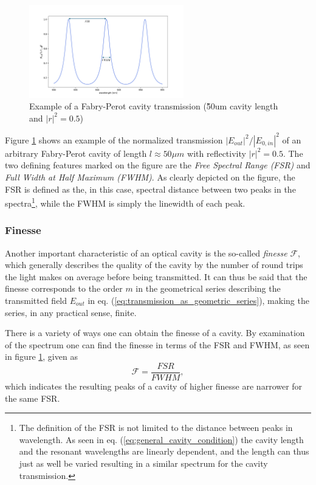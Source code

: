 \begin{figure}
    \centering
    \includegraphics[width=0.6\textwidth]{figures/fabry_perot_example.pdf}
    \caption{Example of a Fabry-Perot cavity transmission (\~50um cavity length and $|r|^2 = 0.5$)}
    \label{fig:generic_fabry_perot}
\end{figure}

Figure \ref{fig:generic_fabry_perot} shows an example of the normalized transmission $|E_{out}|^2/|E_{0,in}|^2$ of an arbitrary Fabry-Perot cavity of length $l \approx 50 \mu m$ with reflectivity $|r|^2 = 0.5$. The two defining features marked on the figure are the \emph{Free Spectral Range (FSR)} and \emph{Full Width at Half Maximum (FWHM)}. As clearly depicted on the figure, the FSR is defined as the, in this case, spectral distance between two peaks in the spectra\footnote{The definition of the FSR is not limited to the distance between peaks in wavelength. As seen in eq. (\ref{eq:general_cavity_condition}) the cavity length and the resonant wavelengths are linearly dependent, and the length can thus just as well be varied resulting in a similar spectrum for the cavity transmission.}, while the FWHM is simply the linewidth of each peak. 

\subsubsection{Finesse}

Another important characteristic of an optical cavity is the so-called \emph{finesse} $\mathcal{F}$, which generally describes the quality of the cavity by the number of round trips the light makes on average before being transmitted. It can thus be said that the finesse corresponds to the order $m$ in the geometrical series describing the transmitted field $E_{out}$ in eq. (\ref{eq:transmission_as_geometric_series}), making the series, in any practical sense, finite.

There is a variety of ways one can obtain the finesse of a cavity. By examination of the spectrum one can find the finesse in terms of the FSR and FWHM, as seen in figure \ref{fig:generic_fabry_perot}, given as
\begin{equation}
    \mathcal{F} = \frac{FSR}{FWHM},
    \label{eq:finesse_FSR_FWHM}
\end{equation}
which indicates the resulting peaks of a cavity of higher finesse are narrower for the same FSR.

